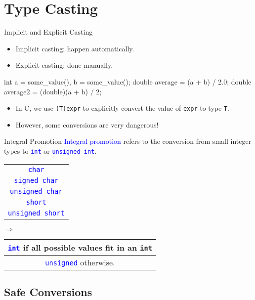 \documentclass[handout]{beamer}
\newcommand{\blue}[1]{\textcolor{blue}{#1}}
\newcommand{\ttt}[1]{\texttt{#1}}
\newcommand{\bluett}[1]{\blue{\ttt{#1}}}
\theoremstyle{definition}
\begin{document}
\section{Type Casting}

\begin{frame}[fragile]{Implicit and Explicit Casting}
    \begin{itemize}
        \item Implicit casting: happen automatically.
        \item Explicit casting: done manually.
    \end{itemize}
    \pause
    \begin{cpp}
int a = some_value(), b = some_value();
double average = (a + b) / 2.0;
double average2 = (double)(a + b) / 2;
    \end{cpp}
    \pause
    \begin{itemize}
        \item In C, we use \ttt{(T)expr} to explicitly convert the value of \ttt{expr} to type \ttt{T}.
        \item However, some conversions are very dangerous!
    \end{itemize}
\end{frame}

\begin{frame}{Integral Promotion}
    \blue{Integral promotion} refers to the conversion from small integer types to \bluett{int} or \bluett{unsigned int}.
    \begin{tabular}{|c|}
        \hline
        \bluett{char}\\
        \bluett{signed char}\\
        \bluett{unsigned char}\\
        \bluett{short}\\
        \bluett{unsigned short}\\
        \hline
    \end{tabular}\(\Rightarrow\)\begin{tabular}{|c|}
        \hline
        \bluett{int} if all possible values fit in an \ttt{int}\\
        \hline
        \bluett{unsigned} otherwise.\\
        \hline
    \end{tabular}
\end{frame}

\subsection{Safe Conversions}
\end{document}
